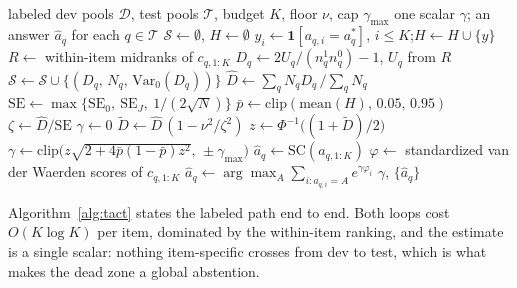 \documentclass[conference]{IEEEtran}
\newcommand{\Dhat}{\widehat{D}}
\newcommand{\TACT}{\textsc{tact}}
\begin{document}
\hypertarget{alg:tact}{\,}
\begin{algorithm}[t]
\caption{\TACT{}: derive the exponent, then vote}

\begin{algorithmic}[1]
\Require labeled dev pools $\mathcal{D}$, test pools $\mathcal{T}$, budget $K$,
floor $\nu$, cap $\gamma_{\max}$
\Ensure one scalar $\gamma$; an answer $\hat a_q$ for each $q\in\mathcal{T}$
\State $\mathcal{S}\gets\emptyset$,\; $H\gets\emptyset$
  \State $y_i\gets\mathbf{1}[a_{q,i}=a^\ast_q]$,\; $i\le K$;\quad $H\gets H\cup\{y\}$
   
    \State $R\gets$ within-item midranks of $c_{q,1:K}$
    \State $D_q\gets 2U_q/(n^1_qn^0_q)-1$, \; $U_q$ from $R$
    \State $\mathcal{S}\gets\mathcal{S}\cup\{(D_q,\,N_q,\,\mathrm{Var}_0(D_q))\}$
  \EndIf
\EndFor
\State $\Dhat\gets\sum_q N_qD_q\,/\sum_q N_q$ 
\State $\mathrm{SE}\gets\max\{\mathrm{SE}_0,\ \mathrm{SE}_J,\ 1/(2\sqrt{N})\}$
\State $\bar p\gets\mathrm{clip}(\mathrm{mean}(H),\,0.05,\,0.95)$
\State $\zeta\gets\Dhat/\mathrm{SE}$
\If{$|\zeta|\le\nu$} 
  \State $\gamma\gets 0$
\Else
  \State $\tilde D\gets\Dhat\,(1-\nu^2/\zeta^2)$ 
  \State $z\gets\Phi^{-1}\big((1+\tilde D)/2\big)$
  \State $\gamma\gets\mathrm{clip}\big(z\sqrt{2+4\bar p(1-\bar p)z^2},\,\pm\gamma_{\max}\big)$
\EndIf
{}
    \State $\hat a_q\gets\mathrm{SC}(a_{q,1:K})$ 
  \Else
    \State $\varphi\gets$ standardized van der Waerden scores of $c_{q,1:K}$
    \State $\hat a_q\gets\arg\max_A\sum_{i:a_{q,i}=A}e^{\gamma\varphi_i}$
  \EndIf
\EndFor
\State \Return $\gamma$, $\{\hat a_q\}$
\end{algorithmic}
\end{algorithm}

Algorithm~\ref{alg:tact} states the labeled path end to end. Both loops cost
$O(K\log K)$ per item, dominated by the within-item ranking, and the estimate
is a single scalar: nothing item-specific crosses from dev to test, which is
what makes the dead zone a global abstention.
\end{document}
